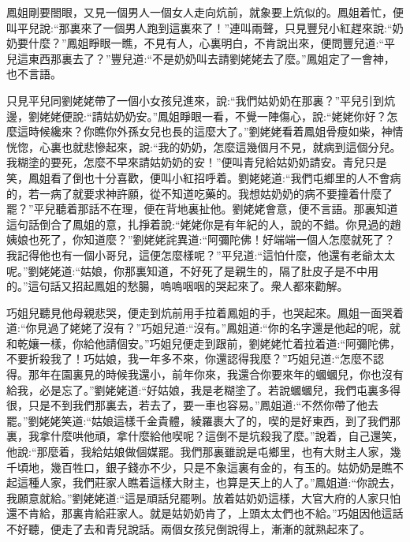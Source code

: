 \begin{parag}
    鳳姐剛要閤眼，又見一個男人一個女人走向炕前，就象要上炕似的。鳳姐着忙，便叫平兒說:“那裏來了一個男人跑到這裏來了！”連叫兩聲，只見豐兒小紅趕來說:“奶奶要什麼？”鳳姐睜眼一瞧，不見有人，心裏明白，不肯說出來，便問豐兒道:“平兒這東西那裏去了？”豐兒道:“不是奶奶叫去請劉姥姥去了麼。”鳳姐定了一會神，也不言語。
\end{parag}


\begin{parag}
    只見平兒同劉姥姥帶了一個小女孩兒進來，說:“我們姑奶奶在那裏？”平兒引到炕邊，劉姥姥便說:“請姑奶奶安。”鳳姐睜眼一看，不覺一陣傷心，說:“姥姥你好？怎麼這時候纔來？你瞧你外孫女兒也長的這麼大了。”劉姥姥看着鳳姐骨瘦如柴，神情恍惚，心裏也就悲慘起來，說:“我的奶奶，怎麼這幾個月不見，就病到這個分兒。我糊塗的要死，怎麼不早來請姑奶奶的安！”便叫青兒給姑奶奶請安。青兒只是笑，鳳姐看了倒也十分喜歡，便叫小紅招呼着。劉姥姥道:“我們屯鄉里的人不會病的，若一病了就要求神許願，從不知道吃藥的。我想姑奶奶的病不要撞着什麼了罷？”平兒聽着那話不在理，便在背地裏扯他。劉姥姥會意，便不言語。那裏知道這句話倒合了鳳姐的意，扎掙着說:“姥姥你是有年紀的人，說的不錯。你見過的趙姨娘也死了，你知道麼？”劉姥姥詫異道:“阿彌陀佛！好端端一個人怎麼就死了？我記得他也有一個小哥兒，這便怎麼樣呢？”平兒道:“這怕什麼，他還有老爺太太呢。”劉姥姥道:“姑娘，你那裏知道，不好死了是親生的，隔了肚皮子是不中用的。”這句話又招起鳳姐的愁腸，嗚嗚咽咽的哭起來了。衆人都來勸解。
\end{parag}


\begin{parag}
    巧姐兒聽見他母親悲哭，便走到炕前用手拉着鳳姐的手，也哭起來。鳳姐一面哭着道:“你見過了姥姥了沒有？”巧姐兒道:“沒有。”鳳姐道:“你的名字還是他起的呢，就和乾孃一樣，你給他請個安。”巧姐兒便走到跟前，劉姥姥忙着拉着道:“阿彌陀佛，不要折殺我了！巧姑娘，我一年多不來，你還認得我麼？”巧姐兒道:“怎麼不認得。那年在園裏見的時候我還小，前年你來，我還合你要來年的蟈蟈兒，你也沒有給我，必是忘了。”劉姥姥道:“好姑娘，我是老糊塗了。若說蟈蟈兒，我們屯裏多得很，只是不到我們那裏去，若去了，要一車也容易。”鳳姐道:“不然你帶了他去罷。”劉姥姥笑道:“姑娘這樣千金貴體，綾羅裹大了的，喫的是好東西，到了我們那裏，我拿什麼哄他頑，拿什麼給他喫呢？這倒不是坑殺我了麼。”說着，自己還笑，他說:“那麼着，我給姑娘做個媒罷。我們那裏雖說是屯鄉里，也有大財主人家，幾千頃地，幾百牲口，銀子錢亦不少，只是不象這裏有金的，有玉的。姑奶奶是瞧不起這種人家，我們莊家人瞧着這樣大財主，也算是天上的人了。”鳳姐道:“你說去，我願意就給。”劉姥姥道:“這是頑話兒罷咧。放着姑奶奶這樣，大官大府的人家只怕還不肯給，那裏肯給莊家人。就是姑奶奶肯了，上頭太太們也不給。”巧姐因他這話不好聽，便走了去和青兒說話。兩個女孩兒倒說得上，漸漸的就熟起來了。
\end{parag}


